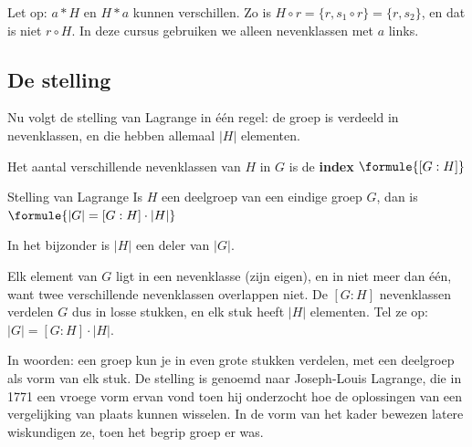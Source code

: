 Let op: $a \ast H$ en $H \ast a$ kunnen verschillen. Zo is $H \circ r = \{r, s_1 \circ r\} = \{r, s_2\}$, en dat is niet $r \circ H$. In deze cursus gebruiken we alleen nevenklassen met $a$ links.

\begin{oefeningen}
\end{oefeningen}

\subsection{De stelling}

Nu volgt de stelling van Lagrange in één regel: de groep is verdeeld in nevenklassen, en die hebben allemaal $|H|$ elementen.

\begin{theorie}
Het aantal verschillende nevenklassen van $H$ in $G$ is de \textbf{\textcolor{accent}{index}} $\formule{[G : H]}$

\begin{stelling}{Stelling van Lagrange}
Is $H$ een deelgroep van een eindige groep $G$, dan is \qquad $\formule{|G| = [G : H] \cdot |H|}$

\vspace{1mm}
In het bijzonder is $|H|$ een deler van $|G|$.
\end{stelling}

\begin{bewijs}
Elk element van $G$ ligt in een nevenklasse (zijn eigen), en in niet meer dan één, want twee verschillende nevenklassen overlappen niet. De $[G : H]$ nevenklassen verdelen $G$ dus in losse stukken, en elk stuk heeft $|H|$ elementen. Tel ze op: $|G| = [G : H] \cdot |H|$.
\end{bewijs}
\end{theorie}

In woorden: een groep kun je in even grote stukken verdelen, met een deelgroep als vorm van elk stuk. De stelling is genoemd naar Joseph-Louis Lagrange, die in 1771 een vroege vorm ervan vond toen hij onderzocht hoe de oplossingen van een vergelijking van plaats kunnen wisselen. In de vorm van het kader bewezen latere wiskundigen ze, toen het begrip groep er was.


